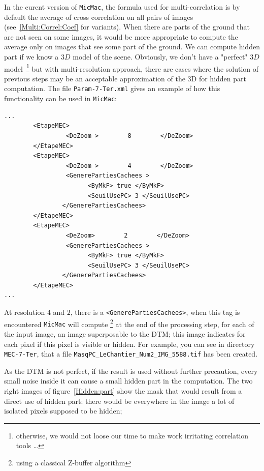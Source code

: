 In the curent version of {\tt MicMac},  the formula used for multi-correlation is
by default  the average of cross correlation on all pairs of images (see~\ref{Multi:Correl:Coef}
for variants).  When there are  parts of the ground that are not seen on some images,
it would be more appropriate to compute the average only on images that see some
part of the ground. We can compute hidden part if we know a $3D$ model of the scene.
Obviously, we don't have a "perfect" $3D$ model~\footnote{otherwise, we would not loose our
time to make work irritating correlation tools \dots } but with multi-resolution
approach, there are cases where the solution of previous steps may be an acceptable
approximation of the 3D for hidden part computation.
The file {\tt Param-7-Ter.xml} gives an example of how this functionality
can be used in {\tt MicMac}:


{\scriptsize
\begin{verbatim}
...
        <EtapeMEC>
                 <DeZoom >        8        </DeZoom>
        </EtapeMEC>
        <EtapeMEC>
                 <DeZoom >        4        </DeZoom>
                 <GenerePartiesCachees >
                       <ByMkF> true </ByMkF>
                       <SeuilUsePC> 3 </SeuilUsePC>
                </GenerePartiesCachees>
        </EtapeMEC>
        <EtapeMEC>
                 <DeZoom>        2        </DeZoom>
                 <GenerePartiesCachees >
                       <ByMkF> true </ByMkF>
                       <SeuilUsePC> 3 </SeuilUsePC>
                </GenerePartiesCachees>
        </EtapeMEC>
...
\end{verbatim}
}


At resolution $4$ and $2$, there is a {\tt <GenerePartiesCachees>}, when this tag
is encountered {\tt MicMac} will compute \footnote{using a classical Z-buffer algorithm}
at the end of the processing
step, for each of the input image, an image
superposable to the DTM; this image indicates for each pixel if this pixel is visible
or hidden. For example, you can see in directory {\tt MEC-7-Ter}, that
a file {\tt  MasqPC\_LeChantier\_Num2\_IMG\_5588.tif} has been created.

As the DTM is not perfect,  if the result is used without further precaution,
every small noise inside it can cause a small hidden part in the computation.
The two right images of figure~\ref{Hidden:part} show the mask that would
result from a direct use of hidden part: there would be everywhere in
the image a lot of isolated pixels supposed to be hidden;

